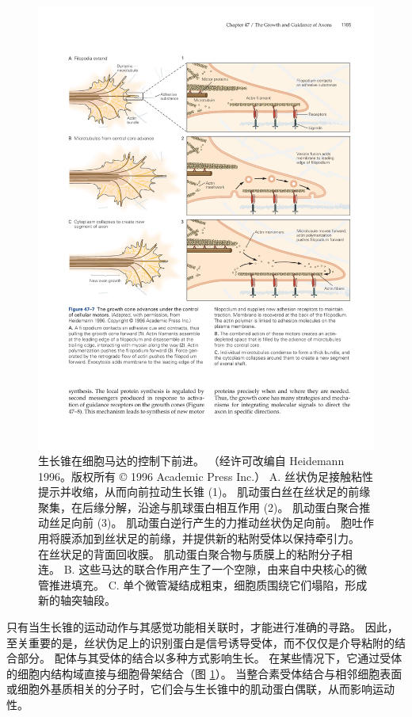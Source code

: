 \begin{figure}[htbp]
	\centering
	\includegraphics[width=0.9\linewidth]{chap47/fig_47_7}
	\caption{生长锥在细胞马达的控制下前进。 （经许可改编自 Heidemann 1996。版权所有 © 1996 Academic Press Inc.） A. 丝状伪足接触粘性提示并收缩，从而向前拉动生长锥 (1)。 肌动蛋白丝在丝状足的前缘聚集，在后缘分解，沿途与肌球蛋白相互作用 (2)。 肌动蛋白聚合推动丝足向前 (3)。 肌动蛋白逆行产生的力推动丝状伪足向前。 胞吐作用将膜添加到丝状足的前缘，并提供新的粘附受体以保持牵引力。 在丝状足的背面回收膜。 肌动蛋白聚合物与质膜上的粘附分子相连。 B. 这些马达的联合作用产生了一个空隙，由来自中央核心的微管推进填充。 C. 单个微管凝结成粗束，细胞质围绕它们塌陷，形成新的轴突轴段。}
	\label{fig:47_7}
\end{figure}

只有当生长锥的运动动作与其感觉功能相关联时，才能进行准确的寻路。 因此，至关重要的是，丝状伪足上的识别蛋白是信号诱导受体，而不仅仅是介导粘附的结合部分。 配体与其受体的结合以多种方式影响生长。 在某些情况下，它通过受体的细胞内结构域直接与细胞骨架结合（图 \ref{fig:47_7}）。 当整合素受体结合与相邻细胞表面或细胞外基质相关的分子时，它们会与生长锥中的肌动蛋白偶联，从而影响运动性。

